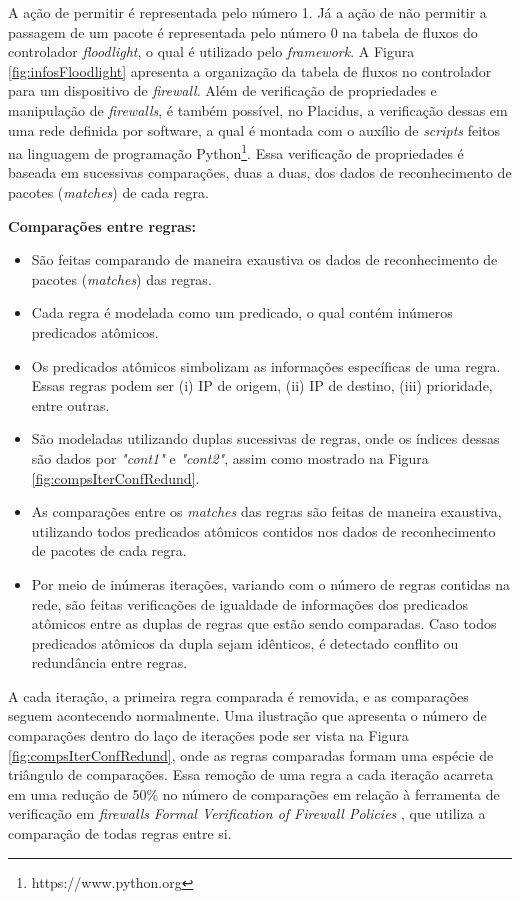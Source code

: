 \documentclass[12pt]{article}
\begin{document}
A ação de permitir é representada pelo número 1. Já a ação de não permitir a passagem de um pacote é representada pelo número 0 na tabela de fluxos do controlador \textit{floodlight}, o qual é utilizado pelo \textit{framework}.
A Figura \ref{fig:infosFloodlight} apresenta a organização da tabela de fluxos no controlador para um dispositivo de \textit{firewall}.
Além de verificação de propriedades e manipulação de \textit{firewalls}, é também possível, no Placidus, a verificação dessas em uma rede definida por software, a qual é montada com o auxílio de \textit{scripts} feitos na linguagem de programação Python\footnote{https://www.python.org}.
Essa verificação de propriedades é baseada em sucessivas comparações, duas a duas, dos dados de reconhecimento de pacotes (\textit{matches}) de cada regra.

\textbf{Comparações entre regras:} 
\begin{itemize}
    \item São feitas comparando de maneira exaustiva os dados de reconhecimento de pacotes (\textit{matches}) das regras.
    \item Cada regra é modelada como um predicado, o qual contém inúmeros predicados atômicos.
    \item Os predicados atômicos simbolizam as informações específicas de uma regra. Essas regras podem ser (i) IP de origem, (ii) IP de destino, (iii) prioridade, entre outras.
    \item São modeladas utilizando duplas sucessivas de regras, onde os índices dessas são dados por \textit{"cont1"} e \textit{"cont2"}, assim como mostrado na Figura \ref{fig:compsIterConfRedund}.
    \item As comparações entre os \textit{matches} das regras são feitas de maneira exaustiva, utilizando todos predicados atômicos contidos nos dados de reconhecimento de pacotes de cada regra.
    \item Por meio de inúmeras iterações, variando com o número de regras contidas na rede, são feitas verificações de igualdade de informações dos predicados atômicos entre as duplas de regras que estão sendo comparadas. Caso todos predicados atômicos da dupla sejam idênticos, é detectado conflito ou redundância entre regras.
\end{itemize}

A cada iteração, a primeira regra comparada é removida, e as comparações seguem acontecendo normalmente. 
Uma ilustração que apresenta o número de comparações dentro do laço de iterações pode ser vista na Figura \ref{fig:compsIterConfRedund}, onde as regras comparadas formam uma espécie de triângulo de comparações.
Essa remoção de uma regra a cada iteração acarreta em uma redução de 50\% no número de comparações em relação à ferramenta de verificação em \textit{firewalls} \textit{Formal Verification of Firewall Policies} \cite{Liu:2009}, que utiliza a comparação de todas regras entre si.
\end{document}
